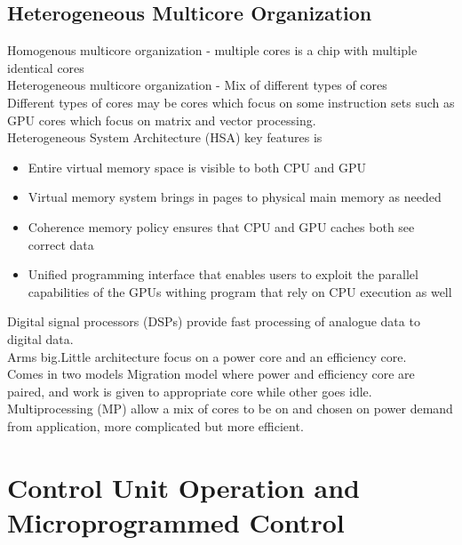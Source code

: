\documentclass[12pt, a4paper]{article}
\begin{document}
		\subsection{Heterogeneous Multicore Organization}
			Homogenous multicore organization - multiple cores is a chip with multiple identical cores\\
			Heterogeneous multicore organization - Mix of different types of cores\\
			Different types of cores may be cores which focus on some instruction sets such as GPU cores which focus on matrix and vector processing.\\
			Heterogeneous System Architecture (HSA) key features is
			\begin{itemize}
				\item Entire virtual memory space is visible to both CPU and GPU
				\item Virtual memory system brings in pages to physical main memory as needed
				\item Coherence memory policy ensures that CPU and GPU caches both see correct data
				\item Unified programming interface that enables users to exploit the parallel capabilities of the GPUs withing program that rely on CPU execution as well
			\end{itemize}
			Digital signal processors (DSPs) provide fast processing of analogue data to digital data.\\
			Arms big.Little architecture focus on a power core and an efficiency core.\\
			Comes in two models Migration model where power and efficiency core are paired, and work is given to appropriate core while other goes idle.\\
			Multiprocessing (MP) allow a mix of cores to be on and chosen on power demand from application, more complicated but more efficient.\\
	\section{Control Unit Operation and Microprogrammed Control}
\end{document}
